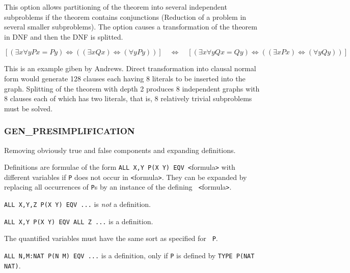 This option allows partitioning of the theorem into several
independent subproblems if the theorem contains conjunctions
(Reduction of a problem in several smaller subproblems). The option
causes a transformation of the theorem in DNF and then the DNF is
splitted.

\Ex

$[(\exists x \forall y Px = Py) \Leftrightarrow ((\exists x Qx)
\Leftrightarrow (\forall y Py))]
\quad\Leftrightarrow\quad
[(\exists x \forall y Qx = Qy) \Leftrightarrow ((\exists x Px)
\Leftrightarrow (\forall y Qy))]$

This is an example giben by Andrews. Direct transformation into clausal
normal form would generate 128 clauses each having 8 literals to be
inserted into the graph.  Splitting of the theorem with depth 2 produces
8 independent graphs with 8 clauses each of which has two literals, that
is, 8 relatively trivial subproblems must be solved.

\PO
{}

\subsubsection{GEN\_PRESIMPLIFICATION}
 
   Removing obviously true and false components and expanding
definitions.

Definitions are formulae of the form {\tt ALL X,Y P(X Y) EQV
<}formula{\tt >} with different variables if {\tt P} does not occur in
{\tt <}formula{\tt >}. They can be expanded by replacing all
occurrences of {\tt P}s by an instance of the defining {\tt
<}formula{\tt >}.

\Ex

{\tt ALL X,Y,Z P(X Y) EQV ...} is {\em not} a definition.

{\tt ALL X,Y P(X Y) EQV ALL Z ...} is a definition.

The quantified variables must have the same sort as specified for {\tt
P}.

\Ex

{\tt ALL N,M:NAT P(N M) EQV ...} is a definition, only if {\tt P} is
defined by {\tt TYPE P(NAT NAT)}.

